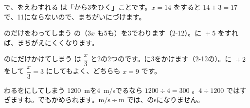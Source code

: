 \begin{tsumazuki}{で、をえわすれる}
は「から3をひく」ことです。$x=14$ をすると $14+3=17$ で、11にならないので、まちがいにづけます。
\end{tsumazuki}

\begin{tsumazuki}{のだけをわってしまう}
\vspace{2pt}
\vspace{2pt}
の（$3x$ も5も）を3でわります（2-12）。に ${}+5$ をすれば、まちがえにくくなります。
\end{tsumazuki}

\begin{tsumazuki}{のにだけかけてしまう}
\vspace{2pt}
\vspace{2pt}
は $\dfrac{x}{3}$ と2の2つのです。に3をかけます（2-12の）。に ${}+2$ をして $\dfrac{x}{3}=3$ にしてもよく、どちらも $x=9$ です。
\end{tsumazuki}

\begin{tsumazuki}{わるをにしてしまう}
\qty{1200}{m}を\qty{4}{m/s}でるなら $1200\div4=300$ 。$4\div1200$ ではすぎますね。でもかめられます。$\mathrm{m/s}\div\mathrm{m}$ では、のsになりません。
\end{tsumazuki}

